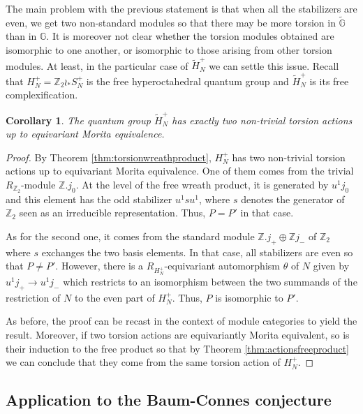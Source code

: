 \documentclass[a4paper, 11pt]{amsart}
\theoremstyle{plain}
\newtheorem{cor}[thm]{Corollary}
\theoremstyle{definition}
\theoremstyle{remark}
\newcommand{\G}{\mathbb{G}}
\newcommand{\Z}{\mathbb{Z}}
\begin{document}
The main problem with the previous statement is that when all the stabilizers are even, we get two non-standard modules so that there may be more torsion in $\widetilde{\G}$ than in $\G$. It is moreover not clear whether the torsion modules obtained are isomorphic to one another, or isomorphic to those arising from other torsion modules. At least, in the particular case of $\widetilde{H}_{N}^{+}$ we can settle this issue. Recall that $H_{N}^{+} = \Z_{2}\wr_{\ast}S_{N}^{+}$ is the free hyperoctahedral quantum group and $\widetilde{H}_{N}^{+}$ is its free complexification.

\begin{cor}\label{cor:torsioncomplexifiedhyperoctahedral}
The quantum group $\widetilde{H}_{N}^{+}$ has exactly two non-trivial torsion actions up to equivariant Morita equivalence.
\end{cor}

\begin{proof}
By Theorem \ref{thm:torsionwreathproduct}, $H_{N}^{+}$ has two non-trivial torsion actions up to equivariant Morita equivalence. One of them comes from the trivial $R_{\Z_{2}}$-module $\Z.j_{0}$. At the level of the free wreath product, it is generated by $u^{1}j_{0}$ and this element has the odd stabilizer $u^{1}su^{1}$, where $s$ denotes the generator of $\Z_{2}$ seen as an irreducible representation. Thus, $P = P'$ in that case.

As for the second one, it comes from the standard module $\Z.j_{+}\oplus \Z j_{-}$ of $\Z_{2}$ where $s$ exchanges the two basis elements. In that case, all stabilizers are even so that $P \neq P'$. However, there is a $R_{H_{N}^{+}}$-equivariant automorphism $\theta$ of $N$ given by $u^{1}j_{+} \to u^{1}j_{-}$ which restricts to an isomorphism between the two summands of the restriction of $N$ to the even part of $H_{N}^{+}$. Thus, $P$ is isomorphic to $P'$.

As before, the proof can be recast in the context of module categories to yield the result. Moreover, if two torsion actions are equivariantly Morita equivalent, so is their induction to the free product so that by Theorem \ref{thm:actionsfreeproduct} we can conclude that they come from the same torsion action of $H_{N}^{+}$.
\end{proof}

\subsection{Application to the Baum-Connes conjecture}
\end{document}
